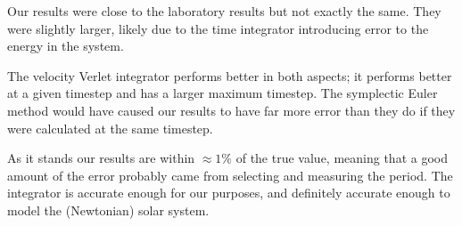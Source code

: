 \documentclass[12pt]{article}
\begin{document}
Our results were close to the laboratory results but not exactly the same. They were slightly larger, likely due to the time integrator introducing error to the energy in the system. 

The velocity Verlet integrator performs better in both aspects; it performs better at a given timestep and has a larger maximum timestep. The symplectic Euler method would have caused our results to have far more error than they do if they were calculated at the same timestep. 

As it stands our results are within $\approx 1\%$ of the true value, meaning that a good amount of the error probably came from selecting and measuring the period. The integrator is accurate enough for our purposes, and definitely accurate enough to model the (Newtonian) solar system. 
\end{document}
